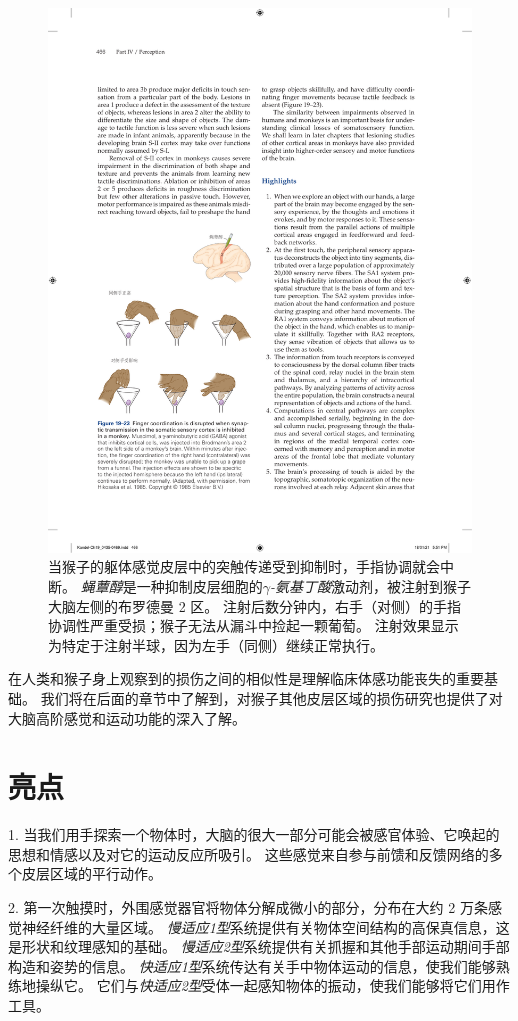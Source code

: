 \begin{figure}[htbp]
	\centering
	\includegraphics[width=0.8\linewidth]{chap19/fig_19_23}
	\caption{当猴子的躯体感觉皮层中的突触传递受到抑制时，手指协调就会中断。
		\textit{蝇蕈醇}是一种抑制皮层细胞的\textit{$\gamma$-氨基丁酸}激动剂，被注射到猴子大脑左侧的布罗德曼 2 区。
		注射后数分钟内，右手（对侧）的手指协调性严重受损；猴子无法从漏斗中捡起一颗葡萄。
		注射效果显示为特定于注射半球，因为左手（同侧）继续正常执行\cite{hikosaka1985deficits}。}
	\label{fig:19_23}
\end{figure}


在人类和猴子身上观察到的损伤之间的相似性是理解临床体感功能丧失的重要基础。 
我们将在后面的章节中了解到，对猴子其他皮层区域的损伤研究也提供了对大脑高阶感觉和运动功能的深入了解。


\section{亮点}

1. 当我们用手探索一个物体时，大脑的很大一部分可能会被感官体验、它唤起的思想和情感以及对它的运动反应所吸引。
这些感觉来自参与前馈和反馈网络的多个皮层区域的平行动作。


2. 第一次触摸时，外围感觉器官将物体分解成微小的部分，分布在大约 2 万条感觉神经纤维的大量区域。 
\textit{慢适应1型}系统提供有关物体空间结构的高保真信息，这是形状和纹理感知的基础。
\textit{慢适应2型}系统提供有关抓握和其他手部运动期间手部构造和姿势的信息。
\textit{快适应1型}系统传达有关手中物体运动的信息，使我们能够熟练地操纵它。
它们与\textit{快适应2型}受体一起感知物体的振动，使我们能够将它们用作工具。 


